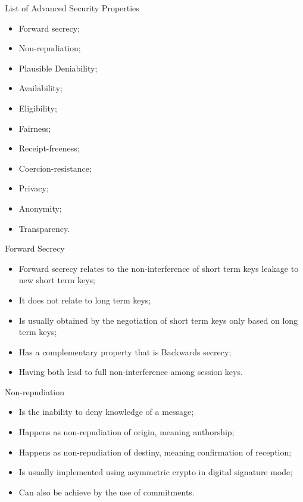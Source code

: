 \documentclass[12pt,table,xcolor={dvipsnames}]{beamer}
\begin{document}
\begin{frame}{List of Advanced Security Properties}
\begin{itemize}
\item Forward secrecy;\pause
\item Non-repudiation;\pause
\item Plausible Deniability;\pause
\item Availability;\pause
\item Eligibility;\pause
\item Fairness;\pause
\item Receipt-freeness;\pause
\item Coercion-resistance;\pause
\item Privacy; \pause
\item Anonymity;\pause
\item Transparency.
\end{itemize}
\end{frame}


\begin{frame}{Forward Secrecy}
\begin{itemize}
\item Forward secrecy relates to the non-interference of short term keys leakage to new short term keys;\pause
\item It does not relate to long term keys;\pause
\item Is usually obtained by the negotiation of short term keys only based on long term keys;\pause
\item Has a complementary property that is Backwards secrecy;\pause
\item Having both lead to full non-interference among session keys.
\end{itemize}
\end{frame}

\begin{frame}{Non-repudiation}
\begin{itemize}
\item Is the inability to deny knowledge of a message;\pause
\item Happens as non-repudiation of origin, meaning authorship;\pause
\item Happens as non-repudiation of destiny, meaning confirmation of reception;\pause
\item Is usually implemented using asymmetric crypto in digital signature mode;\pause
\item Can also be achieve by the use of commitments.
\end{itemize}
\end{frame}
\end{document}
